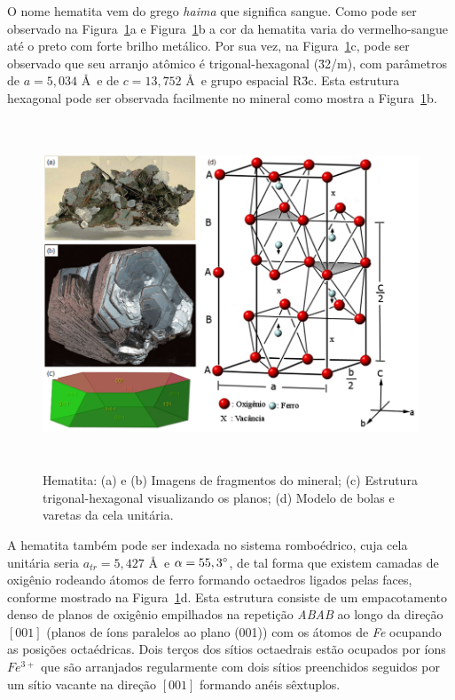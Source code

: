 O nome hematita vem do grego \textit{haima} que significa sangue. Como
pode ser observado na Figura~\ref{fig:2-2}a e Figura~\ref{fig:2-2}b a
cor da hematita varia do vermelho-sangue até o preto com forte brilho
metálico. Por sua vez, na Figura~\ref{fig:2-2}c, pode ser observado
que seu arranjo atômico é trigonal-hexagonal (\={3}2/m), com
parâmetros de $a = 5,034$ \AA~e de $c = 13,752$ \AA~e grupo espacial
R\={3}c.\cite{4,31} Esta estrutura hexagonal pode ser observada
facilmente no mineral como mostra a Figura~\ref{fig:2-2}b.

\begin{figure} [h]
  \begin{center}
    \includegraphics[height=294pt,width=400pt]{images/fig2-2}
    \caption{Hematita: (a) e (b) Imagens de fragmentos do mineral; (c)
      Estrutura trigonal-hexagonal visualizando os planos; (d) Modelo
      de bolas e varetas da cela unitária.\cite{4,31}}\label{fig:2-2}
  \end{center}
\end{figure}

A hematita também pode ser indexada no sistema romboédrico, cuja cela
unitária seria $a_{tr} = 5,427$ \AA~e $\alpha = 55,3^\circ$, de tal
forma que existem camadas de oxigênio rodeando átomos de ferro
formando octaedros ligados pelas faces, conforme mostrado na
Figura~\ref{fig:2-2}d. Esta estrutura consiste de um empacotamento
denso de planos de oxigênio empilhados na repetição \textit{ABAB} ao
longo da direção $[001]$ (planos de íons paralelos ao plano (001)) com
os átomos de \textit{Fe} ocupando as posições octaédricas. Dois terços
dos sítios octaedrais estão ocupados por íons $Fe ^{3+}$ que são
arranjados regularmente com dois sítios preenchidos seguidos por um
sítio vacante na direção $[001]$ formando anéis sêxtuplos.\cite{4,32}


